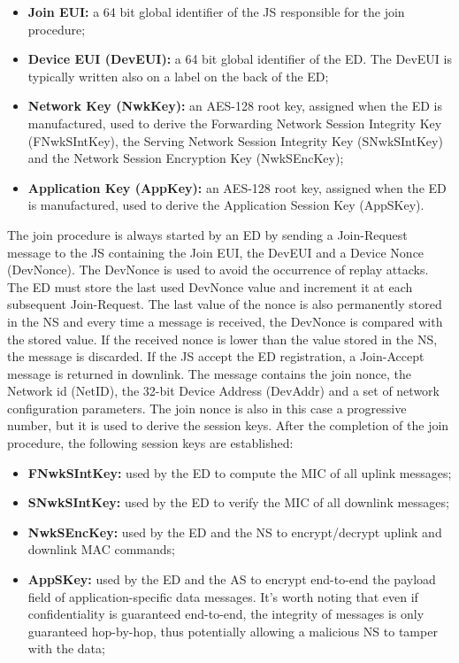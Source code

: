 \begin{itemize}
	\item \textbf{Join EUI:} a 64 bit global identifier of the \gls{JS} responsible for the join procedure;
	\item \textbf{Device EUI (DevEUI):} a 64 bit global identifier of the \gls{ED}. The DevEUI is typically written also on a label on the back of the \gls{ED};
	\item \textbf{Network Key (NwkKey):} an AES-128 root key, assigned when the \gls{ED} is manufactured, used to derive the Forwarding Network Session Integrity Key (FNwkSIntKey), the Serving Network Session Integrity Key (SNwkSIntKey) and the Network Session Encryption Key (NwkSEncKey);
	\item \textbf{Application Key (AppKey):} an AES-128 root key, assigned when the \gls{ED} is manufactured, used to derive the Application Session Key (AppSKey).
\end{itemize}

The join procedure is always started by an \gls{ED} by sending a Join-Request message to the \gls{JS} containing the Join EUI, the DevEUI and a Device Nonce (DevNonce). The DevNonce is used to avoid the occurrence of replay attacks. The \gls{ED} must store the last used DevNonce value and increment it at each subsequent Join-Request. The last value of the nonce is also permanently stored in the \gls{NS} and every time a message is received, the DevNonce is compared with the stored value. If the received nonce is lower than the value stored in the \gls{NS}, the message is discarded. If the \gls{JS} accept the \gls{ED} registration, a Join-Accept message is returned in downlink. The message contains the join nonce, the Network id (NetID), the 32-bit Device Address (DevAddr) and a set of network configuration parameters. The join nonce is also in this case a progressive number, but it is used to derive the session keys. After the completion of the join procedure, the following session keys are established:

\begin{itemize}

\item \textbf{FNwkSIntKey:} used by the \gls{ED} to compute the \gls{MIC} of all uplink messages;
\item \textbf{SNwkSIntKey:} used by the \gls{ED} to verify the \gls{MIC} of all downlink messages;
\item \textbf{NwkSEncKey:} used by the \gls{ED} and the \gls{NS} to encrypt/decrypt uplink and downlink MAC commands;
\item \textbf{AppSKey:} used by the \gls{ED} and the \gls{AS} to encrypt end-to-end the payload field of application-specific data messages. It's worth noting that even if confidentiality is guaranteed end-to-end, the integrity of messages is only guaranteed hop-by-hop, thus potentially allowing a malicious \gls{NS} to tamper with the data;

\end{itemize}


